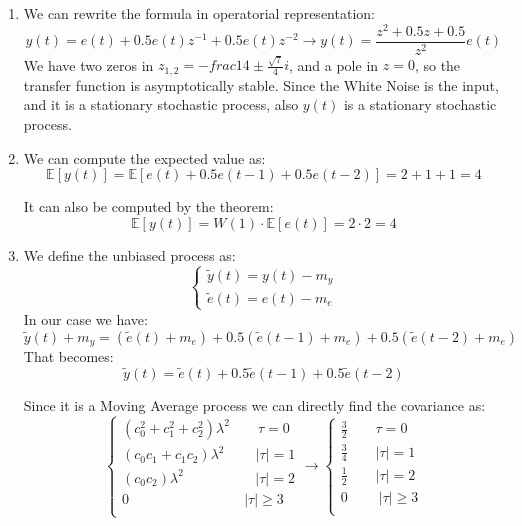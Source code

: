 \begin{enumerate}
    \item We can rewrite the formula in operatorial representation: 
        \[y(t)=e(t)+0.5e(t)z^{-1}+0.5e(t)z^{-2}\rightarrow y(t)=\dfrac{z^2+0.5z+0.5}{z^2}e(t)\]
        We have two zeros in $z_{1,2}=-frac{1}{4}\pm \frac{\sqrt{7}}{4}i$, and a pole in $z=0$, so the transfer function is asymptotically stable. 
        Since the White Noise is the input, and it is a stationary stochastic process, also $y(t)$ is a stationary stochastic process. 
    \item We can compute the expected value as: 
        \[\mathbb{E}\left[ y(t) \right]=\mathbb{E}\left[ e(t)+0.5e(t-1)+0.5e(t-2) \right]=2+1+1=4\]

        It can also be computed by the theorem: 
        \[\mathbb{E}\left[ y(t) \right]=W(1)\cdot\mathbb{E}\left[ e(t) \right]=2\cdot 2=4\]

    \item We define the unbiased process as: 
        \[\begin{cases}
            \tilde{y}(t)=y(t)-m_y \\
            \tilde{e}(t)=e(t)-m_e
        \end{cases}\]
        In our case we have: 
        \[\tilde{y}(t)+m_y=\left(\tilde{e}(t)+m_e\right)+0.5\left(\tilde{e}(t-1)+m_e\right)+0.5\left(\tilde{e}(t-2)+m_e\right)\]
        That becomes: 
        \[\tilde{y}(t)=\tilde{e}(t)+0.5\tilde{e}(t-1)+0.5\tilde{e}(t-2)\]

        Since it is a Moving Average process we can directly find the covariance as: 
        \[\begin{cases}
            \left(c_0^2+c_1^2+c_2^2\right)\lambda^2 \qquad \tau=0 \\
            \left(c_0c_1+c_1c_2\right)\lambda^2 \qquad\: \left\lvert \tau\right\rvert =1 \\
            \left(c_0c_2\right)\lambda^2 \qquad\qquad\:\:\:\:\: \left\lvert \tau\right\rvert =2 \\
            0 \qquad\qquad\qquad\qquad\: \left\lvert \tau\right\rvert \geq 3 \\
        \end{cases} \rightarrow \begin{cases}
            \frac{3}{2} \qquad \tau=0 \\
            \frac{3}{4} \qquad \left\lvert \tau\right\rvert =1 \\
            \frac{1}{2} \qquad \left\lvert \tau\right\rvert =2 \\
            0 \:\qquad \left\lvert \tau\right\rvert \geq 3 \\
        \end{cases}\]
\end{enumerate}